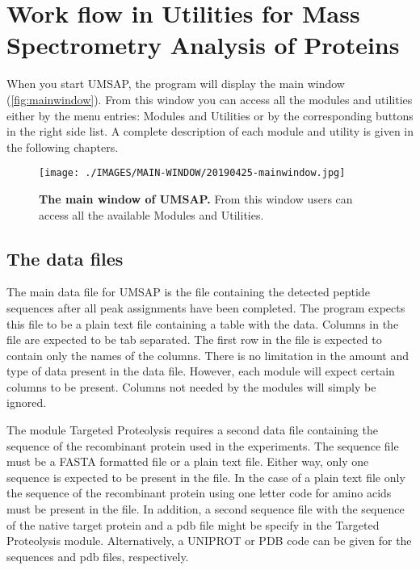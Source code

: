 \chapter{Work flow in Utilities for Mass Spectrometry Analysis of Proteins}
\label{chap:workflow}

When you start UMSAP, the program will display the main window (\autoref{fig:mainwindow}). From this window you can access all the modules and utilities either by the menu entries: Modules and Utilities or by the corresponding buttons in the right side list. A complete description of each module and utility is given in the following chapters.

\begin{figure}[h]
	\centering
	\texttt{[image: ./IMAGES/MAIN-WINDOW/20190425-mainwindow.jpg]}	    
	\caption[The main window of UMSAP]{\textbf{The main window of UMSAP.} From this window users can access all the available Modules and Utilities.} 
	\label{fig:mainwindow}
	\vspace{-5pt} 	
\end{figure}  

\section{The data files}
\label{sec:datafile}

The main data file for UMSAP is the file containing the detected peptide sequences after all peak assignments have been completed. The program expects this file to be a plain text file containing a table with the data. Columns in the file are expected to be tab separated. The first row in the file is expected to contain only the names of the columns. There is no limitation in the amount and type of data present in the data file. However, each module will expect certain columns to be present. Columns not needed by the modules will simply be ignored.

The module Targeted Proteolysis requires a second data file containing the sequence of the recombinant protein used in the experiments. The sequence file must be a FASTA formatted file or a plain text file. Either way, only one sequence is expected to be present in the file. In the case of a plain text file only the sequence of the recombinant protein using one letter code for amino acids must be present in the file. In addition, a second sequence file with the sequence of the native target protein and a pdb file might be specify in the Targeted Proteolysis module. Alternatively, a UNIPROT or PDB code can be given for the sequences and pdb files, respectively.

